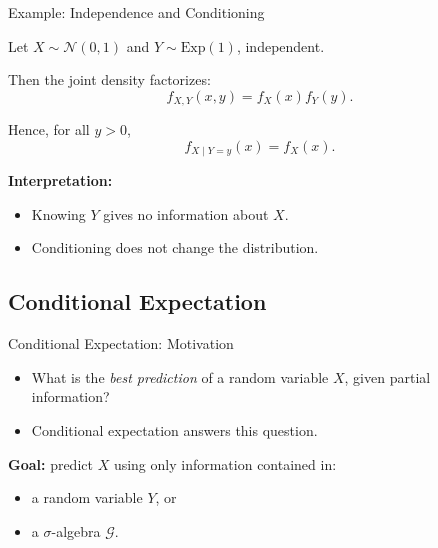 \documentclass[aspectratio=169]{beamer}
\begin{document}
\begin{frame}{Example: Independence and Conditioning}

Let \(X\sim \mathcal{N}(0,1)\) and \(Y\sim \mathrm{Exp}(1)\),
independent.
\pause
\medskip

Then the joint density factorizes:
\[
f_{X,Y}(x,y)=f_X(x)f_Y(y).
\]
\pause
\medskip

Hence, for all \(y>0\),
\[
f_{X\mid Y=y}(x)=f_X(x).
\]
\pause
\medskip

\textbf{Interpretation:}
\begin{itemize}
  \item Knowing \(Y\) gives no information about \(X\).\pause
  \item Conditioning does not change the distribution.
\end{itemize}

\end{frame}

\subsection{Conditional Expectation}

\begin{frame}{Conditional Expectation: Motivation}

\begin{itemize}
  \item What is the \emph{best prediction} of a random variable \(X\),
  given partial information?\pause
  \item Conditional expectation answers this question.\pause
\end{itemize}

\medskip

\textbf{Goal:}
predict \(X\) using only information contained in:
\begin{itemize}
  \item a random variable \(Y\), or\pause
  \item a \(\sigma\)-algebra \(\mathcal{G}\).
\end{itemize}

\end{frame}

\end{document}
